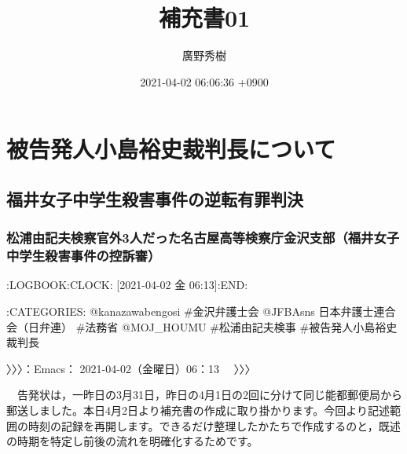 \documentclass[
]{ltjarticle}
\title{補充書01}
\author{廣野秀樹}
\date{2021-04-02 06:06:36 +0900}
\begin{document}
\maketitle

{
\setcounter{tocdepth}{4}
\tableofcontents
}
\hypertarget{ux88abux544aux767aux4ebaux5c0fux5cf6ux88d5ux53f2ux88c1ux5224ux9577ux306bux3064ux3044ux3066}{%
\section{被告発人小島裕史裁判長について}\label{ux88abux544aux767aux4ebaux5c0fux5cf6ux88d5ux53f2ux88c1ux5224ux9577ux306bux3064ux3044ux3066}}

\hypertarget{ux798fux4e95ux5973ux5b50ux4e2dux5b66ux751fux6bbaux5bb3ux4e8bux4ef6ux306eux9006ux8ee2ux6709ux7f6aux5224ux6c7a}{%
\subsection{福井女子中学生殺害事件の逆転有罪判決}\label{ux798fux4e95ux5973ux5b50ux4e2dux5b66ux751fux6bbaux5bb3ux4e8bux4ef6ux306eux9006ux8ee2ux6709ux7f6aux5224ux6c7a}}

\hypertarget{ux677eux6d66ux7531ux8a18ux592bux691cux5bdfux5b98ux59163ux4ebaux3060ux3063ux305fux540dux53e4ux5c4bux9ad8ux7b49ux691cux5bdfux5e81ux91d1ux6ca2ux652fux90e8ux798fux4e95ux5973ux5b50ux4e2dux5b66ux751fux6bbaux5bb3ux4e8bux4ef6ux306eux63a7ux8a34ux5be9}{%
\subsubsection{松浦由記夫検察官外3人だった名古屋高等検察庁金沢支部（福井女子中学生殺害事件の控訴審）}\label{ux677eux6d66ux7531ux8a18ux592bux691cux5bdfux5b98ux59163ux4ebaux3060ux3063ux305fux540dux53e4ux5c4bux9ad8ux7b49ux691cux5bdfux5e81ux91d1ux6ca2ux652fux90e8ux798fux4e95ux5973ux5b50ux4e2dux5b66ux751fux6bbaux5bb3ux4e8bux4ef6ux306eux63a7ux8a34ux5be9}}

:LOGBOOK:CLOCK: {[}2021-04-02 金 06:13{]}:END:

:CATEGORIES: @kanazawabengosi \#金沢弁護士会 @JFBAsns
日本弁護士連合会（日弁連） \#法務省 @MOJ\_HOUMU \#松浦由記夫検事
\#被告発人小島裕史裁判長

〉〉〉：Emacs： 2021-04-02（金曜日）06：13　 〉〉〉

　告発状は，一昨日の3月31日，昨日の4月1日の2回に分けて同じ能都郵便局から郵送しました。本日4月2日より補充書の作成に取り掛かります。今回より記述範囲の時刻の記録を再開します。できるだけ整理したかたちで作成するのと，既述の時期を特定し前後の流れを明確化するためです。
\end{document}

